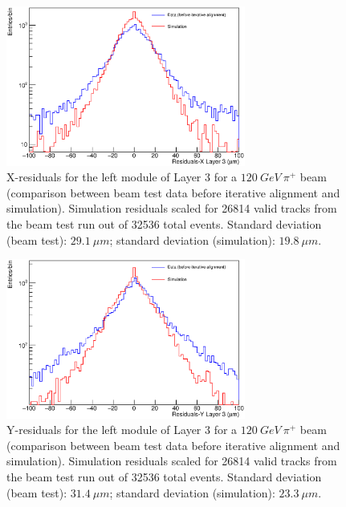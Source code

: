 \documentclass[a4paper,11pt]{article}
\begin{document}
\begin{figure}[htbp]
	\centering %
	\includegraphics[width=0.7\textwidth,origin=c,angle=0]{Res_X_comparison_with_scale_log.eps}
	\caption{\label{fig:6} X-residuals for the left module of Layer 3 for a $120\: GeV\: \pi^{+}$ beam (comparison between beam test data before iterative alignment and simulation). Simulation residuals scaled for 26814 valid tracks from the beam test run out of 32536 total events. \newline Standard deviation (beam test): $29.1\: \mu m$; standard deviation (simulation): $19.8\: \mu m$.}
\end{figure}

\begin{figure}[htbp]
	\centering %
	\includegraphics[width=0.7\textwidth,origin=c,angle=0]{Res_Y_comparison_with_scale_log.eps}
	\caption{\label{fig:7} Y-residuals for the left module of Layer 3 for a $120\: GeV\: \pi^{+}$ beam (comparison between beam test data before iterative alignment and simulation). Simulation residuals scaled for 26814 valid tracks from the beam test run out of 32536 total events. \newline Standard deviation (beam test): $31.4\: \mu m$; standard deviation (simulation): $23.3\: \mu m$.}
\end{figure}
\end{document}
